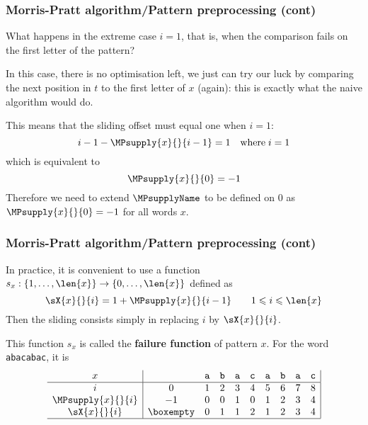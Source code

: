 %
\begin{frame}
\frametitle{Morris-Pratt algorithm/Pattern preprocessing (cont)}

\label{beta_zero}

What happens in the extreme case \(i = 1\), that is, when the
comparison fails on the first letter of the pattern?

\bigskip

In this case, there is no optimisation left, we just can try our luck
by comparing the next position in \(t\) to the first letter of \(x\)
(again): this is exactly what the naive algorithm would do.

\bigskip

This means that the sliding offset must equal one when \(i=1\):
\[
i - 1 - \MPsupply{x}{}{i-1} = 1 \quad \text{where} \; i = 1
\]
which is equivalent to
\[
\MPsupply{x}{}{0} = -1
\]
Therefore we need to extend \(\MPsupplyName\) to be defined on \(0\) as
\(\MPsupply{x}{}{0} = -1\) for all words \(x\).

\end{frame}

%
\begin{frame}
\frametitle{Morris-Pratt algorithm/Pattern preprocessing (cont)}

\label{supply}

In practice, it is convenient to use a function
\(
s_{x}: \{1, \dots, \len{x}\} \rightarrow \{0, \dots, \len{x}\}
\)
defined as 
\[
\sX{x}{}{i} = 1 + \MPsupply{x}{}{i-1} \qquad 1 \leqslant i \leqslant
\len{x}
\]
Then the sliding consists simply in replacing \(i\) by \(\sX{x}{}{i}\).

\bigskip

This function \(s_{x}\) is called the \textbf{failure function} of
pattern \(x\). For the word \texttt{abacabac}, it is
\[
\begin{array}{c|ccccccccc|}
x & & \texttt{a} & \texttt{b} & \texttt{a} & \texttt{c} & \texttt{a} 
 & \texttt{b} & \texttt{a} & \texttt{c}\\
\hline
  i
& 0 & 1 & 2 & 3 & 4 & 5 & 6 & 7 & 8\\
  \MPsupply{x}{}{i}
& -1 & 0 & 0 & 1 & 0 & 1 & 2 & 3 & 4\\
  \sX{x}{}{i}
& \boxempty & 0 & 1 & 1 & 2 & 1 & 2 & 3 & 4\\
\hline
\end{array}
\]

\end{frame}

